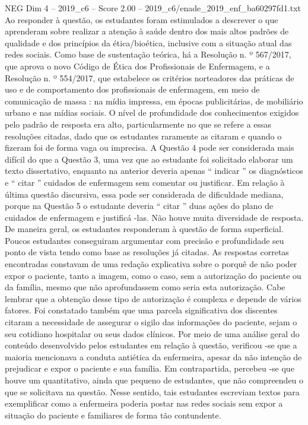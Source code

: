 \begin{textsample}{NEG Dim 4 – 2019\_c6 – Score 2.00 – 2019\_c6/enade\_2019\_enf\_ba60297fd1.txt}
Ao responder à questão, os estudantes foram estimulados a descrever o que aprenderam sobre realizar a atenção à saúde dentro dos mais altos padrões de qualidade e dos princípios da ética/bioética, inclusive com a situação atual das redes sociais.
Como base de sustentação teórica, há a Resolução n. º 567/2017, que aprova o novo Código de Ética dos Profissionais de Enfermagem, e a Resolução n. º 554/2017, que estabelece os critérios norteadores das práticas de uso e de comportamento dos profissionais de enfermagem, em meio de comunicação de massa : na mídia impressa, em épocas publicitárias, de mobiliário urbano e nas mídias sociais.
O nível de profundidade dos conhecimentos exigidos pelo padrão de resposta era alto, particularmente no que se refere a essas resoluções citadas, dado que os estudantes raramente as citaram e quando o fizeram foi de forma vaga ou imprecisa.
A Questão 4 pode ser considerada mais difícil do que a Questão 3, uma vez que ao estudante foi solicitado elaborar um texto dissertativo, enquanto na anterior deveria apenas “ indicar ” os diagnósticos e “ citar ” cuidados de enfermagem sem comentar ou justificar.
Em relação à última questão discursiva, essa pode ser considerada de dificuldade mediana, porque na Questão 5 o estudante deveria “ citar ” duas ações do plano de cuidados de enfermagem e justificá -las.
Não houve muita diversidade de resposta.
De maneira geral, os estudantes responderam à questão de forma superficial.
Poucos estudantes conseguiram argumentar com precisão e profundidade seu ponto de vista tendo como base as resoluções já citadas.
As respostas corretas encontradas constavam de uma redação explicativa sobre o porquê de não poder expor o paciente, tanto a imagem, como o caso, sem a autorização do paciente ou da família, mesmo que não aprofundassem como seria esta autorização.
Cabe lembrar que a obtenção desse tipo de autorização é complexa e depende de vários fatores.
Foi constatado também que uma parcela significativa dos discentes citaram a necessidade de assegurar o sigilo das informações do paciente, sejam o seu cotidiano hospitalar ou seus dados clínicos.
Por meio de uma análise geral do conteúdo desenvolvido pelos estudantes em relação à questão, verificou -se que a maioria mencionava a conduta antiética da enfermeira, apesar da não intenção de prejudicar e expor o paciente e sua família.
Em contrapartida, percebeu -se que houve um quantitativo, ainda que pequeno de estudantes, que não compreendeu o que se solicitava na questão.
Nesse sentido, tais estudantes escreviam textos para exemplificar como a enfermeira poderia postar nas redes sociais sem expor a situação do paciente e familiares de forma tão contundente.

\end{textsample}
